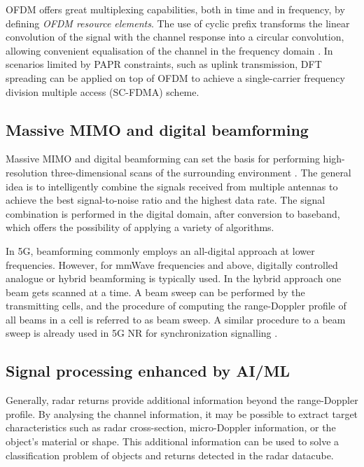 	OFDM offers great multiplexing capabilities, both in time and in frequency, by defining  \textit{OFDM resource elements}. The use of cyclic prefix transforms the linear convolution of the signal with the channel response into a circular convolution, allowing convenient equalisation of the channel in the frequency domain \cite{Wild_Grudnitsky_Mandelli_Henninger_Guan_Schaich_2023}. In scenarios limited by PAPR constraints, such as uplink transmission, DFT spreading can  be applied on top of OFDM to achieve a single-carrier frequency division multiple access (SC-FDMA) scheme.

	
	\subsection{Massive MIMO and digital beamforming}
	
	Massive MIMO and digital beamforming can set the basis for performing high-resolution three-dimensional scans of the surrounding environment \cite{MIMO-next-gen}.
	The general idea is to intelligently combine the signals received from multiple antennas to achieve the best signal-to-noise ratio and the highest data rate. The signal combination is performed in the digital domain, after conversion to baseband, which offers the possibility of applying a variety of algorithms.
	
	In 5G, beamforming commonly employs an all-digital approach at lower frequencies. However, for mmWave frequencies and above, digitally controlled analogue or hybrid beamforming is typically used. In the hybrid approach one beam gets scanned at a time. A beam sweep can be performed by the transmitting cells, and the procedure of computing the range-Doppler profile of all beams in a cell is referred to as beam sweep. A similar procedure to a beam sweep is already used in 5G NR for synchronization signalling \cite{Wild_Braun_Viswanathan_2021}.
	
	\subsection{Signal processing enhanced by AI/ML}
	Generally, radar returns provide additional information beyond the range-Doppler profile. By analysing the channel information, it may be possible to extract target characteristics such as radar cross-section, micro-Doppler information, or the object's material or shape.
	This additional information can be used to solve a classification problem of objects and returns detected in the radar datacube.
	
